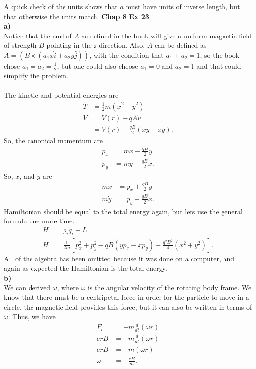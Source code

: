 \documentclass[10pt]{article}
\begin{document}
A quick check of the units shows that $a$ must have units of inverse length, but that otherwise the units match.
\textbf{Chap 8 Ex 23}\\
\textbf{a)}\\
Notice that the curl of $A$ as defined in the book will give a uniform magnetic field of strength $B$
pointing in the z direction.  Also, $A$ can be defined as $A=(B\times(a_1 x \hat i + a_2 y \hat j))$, with
the condition that $a_1+a_2=1$, so the book chose $a_1=a_2=\frac{1}{2}$, but one could also choose
$a_1=0$ and $a_2=1$ and that could simplify the problem.\\
\\
The kinetic and potential energies are
\begin{align*}
  T &= \frac{1}{2}m(\dot x^2+ \dot y^2)\\
  V &= V(r) - q A\dot v\\
  &= V(r) - \frac{q B}{2} (x\dot y-\dot xy).
\end{align*}
So, the canonical momentum are
\begin{align*}
  p_x &= m\dot x - \frac{q B}{2} y\\
  p_y &= m\dot y + \frac{q B}{2} x.
\end{align*}
So, $\dot x$, and $\dot y$ are
\begin{align*}
  m\dot x &= p_x + \frac{q B}{2} y\\
  m\dot y &= p_y - \frac{q B}{2} x.
\end{align*}
Hamiltonian should be equal to the total energy again, but lets use the general formula
one more time.  
\begin{align*}
  H &= p_iq_i-L\\
  H &= \frac{1}{2m}\left[ p_x^2+p_y^2-qB(yp_x-xp_y)-\frac{q^2B^2}{4}(x^2+y^2) \right].
\end{align*}
All of the algebra has been omitted because it was done on a computer, and again as
expected the Hamiltonian is the total energy.\\
\textbf{b)}\\
We can derived $\omega$, where $\omega$ is the angular velocity of the rotating body frame.  We know
that there must be a centripetal force in order for the particle to move in a circle, the magnetic field 
provides this force, but it can also be written in terms of $\omega$.  Thus, we have
\begin{align*}
  F_c &= -m\frac{d}{dt}(\omega r)\\
  e\dot rB &= -m\frac{d}{dt}(\omega r)\\
  erB &= -m(\omega r)\\
  \omega &= -\frac{eB}{m}.
\end{align*}
\end{document}
